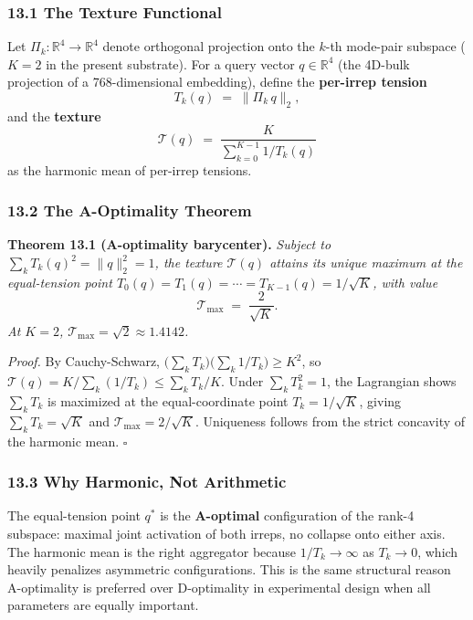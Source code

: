 \documentclass[
  11pt,
]{article}
\begin{document}
\subsubsection{13.1 The Texture
Functional}\label{the-texture-functional}

Let \(\Pi_k : \mathbb{R}^4 \to \mathbb{R}^4\) denote orthogonal
projection onto the \(k\)-th mode-pair subspace (\(K = 2\) in the
present substrate). For a query vector \(q \in \mathbb{R}^4\) (the
4D-bulk projection of a 768-dimensional embedding), define the
\textbf{per-irrep tension} \[T_k(q) \;=\; \|\Pi_k\, q\|_2, \tag{13.1}\]
and the \textbf{texture}
\[\boxed{\quad \mathcal{T}(q) \;=\; \frac{K}{\sum_{k=0}^{K-1} 1/T_k(q)} \quad} \tag{13.2}\]
as the harmonic mean of per-irrep tensions.

\subsubsection{13.2 The A-Optimality
Theorem}\label{the-a-optimality-theorem}

\textbf{Theorem 13.1 (A-optimality barycenter).} \emph{Subject to
\(\sum_k T_k(q)^2 = \|q\|_2^2 = 1\), the texture \(\mathcal{T}(q)\)
attains its unique maximum at the equal-tension point
\(T_0(q) = T_1(q) = \cdots = T_{K-1}(q) = 1/\sqrt K\), with value}
\[\mathcal{T}_\text{max} \;=\; \frac{2}{\sqrt K}. \tag{13.3}\] \emph{At
\(K = 2\), \(\mathcal{T}_\text{max} = \sqrt 2 \approx 1.4142\).}

\emph{Proof.} By Cauchy-Schwarz,
\(\bigl(\sum_k T_k\bigr)\bigl(\sum_k 1/T_k\bigr) \geq K^2\), so
\(\mathcal{T}(q) = K/\sum_k(1/T_k) \leq \sum_k T_k / K\). Under
\(\sum_k T_k^2 = 1\), the Lagrangian shows \(\sum_k T_k\) is maximized
at the equal-coordinate point \(T_k = 1/\sqrt K\), giving
\(\sum_k T_k = \sqrt K\) and \(\mathcal{T}_\text{max} = 2/\sqrt K\).
Uniqueness follows from the strict concavity of the harmonic mean.
\(\square\)

\subsubsection{13.3 Why Harmonic, Not
Arithmetic}\label{why-harmonic-not-arithmetic}

The equal-tension point \(q^*\) is the \textbf{A-optimal} configuration
of the rank-4 subspace: maximal joint activation of both irreps, no
collapse onto either axis. The harmonic mean is the right aggregator
because \(1/T_k \to \infty\) as \(T_k \to 0\), which heavily penalizes
asymmetric configurations. This is the same structural reason
A-optimality is preferred over D-optimality in experimental design when
all parameters are equally important.
\end{document}
